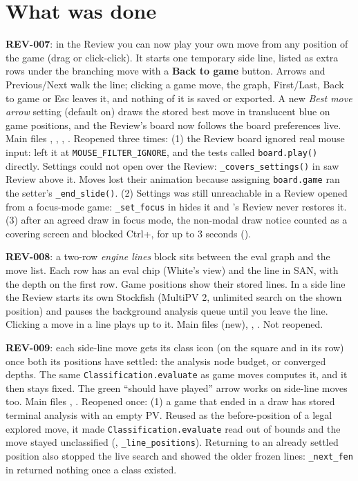 \documentclass[11pt,a4paper]{article}
\begin{document}
\section*{What was done}

\textbf{REV-007}: in the Review you can now play your own move from any position of the game (drag
or click-click). It starts one temporary side line, listed as extra rows under the branching move
with a \textbf{Back to game} button. Arrows and Previous/Next walk the line; clicking a game move,
the graph, First/Last, Back to game or Esc leaves it, and nothing of it is saved or exported. A new
\emph{Best move arrow} setting (default on) draws the stored best move in translucent blue on game
positions, and the Review's board now follows the board preferences live. Main files
, , , .
Reopened three times:
(1) the Review board ignored real mouse input:  left it at
\texttt{MOUSE\_FILTER\_IGNORE}, and the tests called \texttt{board.play()} directly. Settings could
not open over the Review: \texttt{\_covers\_settings()} in  saw Review above
it. Moves lost their animation because assigning \texttt{board.game} ran the setter's
\texttt{\_end\_slide()}.
(2) Settings was still unreachable in a Review opened from a focus-mode game: \texttt{\_set\_focus}
in  hides it and 's Review never restores it.
(3) after an agreed draw in focus mode, the non-modal draw notice counted as a covering screen and
blocked Ctrl+, for up to 3 seconds ().

\textbf{REV-008}: a two-row \emph{engine lines} block sits between the eval graph and the move
list. Each row has an eval chip (White's view) and the line in SAN, with the depth on the first
row. Game positions show their stored lines. In a side line the Review starts its own Stockfish
(MultiPV 2, unlimited search on the shown position) and pauses the background analysis queue
until you leave the line. Clicking a move in a line plays up to it. Main files
 (new), , . Not reopened.

\textbf{REV-009}: each side-line move gets its class icon (on the square and in its row) once both
its positions have settled: the analysis node budget, or converged depths. The same
\texttt{Classification.evaluate} as game moves computes it, and it then stays fixed. The green
``should have played'' arrow works on side-line moves too. Main files
, . Reopened once:
(1) a game that ended in a draw has stored terminal analysis with an empty PV. Reused as the
before-position of a legal explored move, it made \texttt{Classification.evaluate} read out of
bounds and the move stayed unclassified (, \texttt{\_line\_positions}).
Returning to an already settled position also stopped the live search and showed the older frozen
lines: \texttt{\_next\_fen} in  returned nothing once a class
existed.
\end{document}
